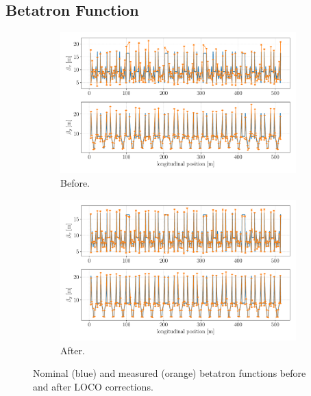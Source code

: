\subsection{Betatron Function}
\begin{figure}
\centering
\begin{subfigure}[t]{0.49\textwidth}
\includegraphics[width=1.0\textwidth]{figures/beta_tuneshift_before_loco.pdf}
    \caption{Before.}
    \label{subfig:beta_before}
\end{subfigure}
 \begin{subfigure}[t]{0.49\textwidth}
\includegraphics[width=1.0\textwidth]{figures/beta_tuneshift_after_loco.pdf}
    \caption{After.}
    \label{subfig:beta_after}
\end{subfigure}
\caption{Nominal (blue) and measured (orange) betatron functions before and after LOCO corrections.}
\label{fig:beta_tuneshift}
\end{figure}



